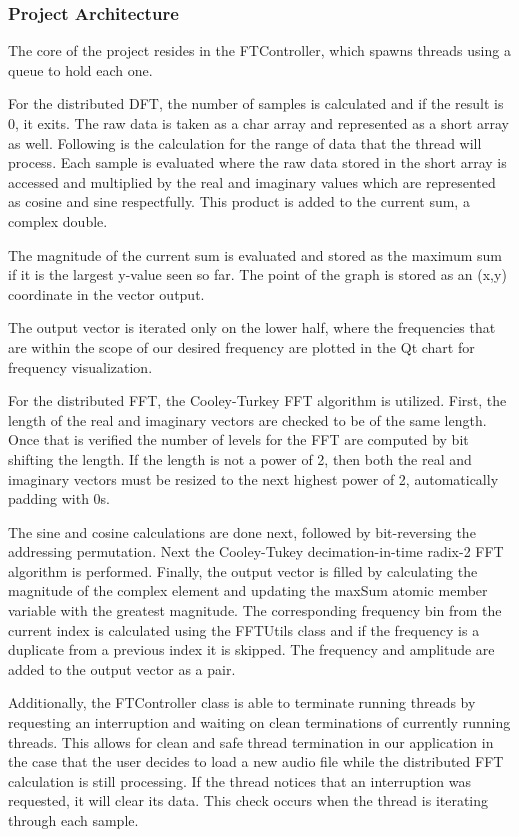 \documentclass[journal]{IEEEtran}
\begin{document}
\subsubsection{Project Architecture}
    \par{
		The core of the project resides in the FTController, which spawns threads using a queue to hold each one.
	}
    \par{
		For the distributed DFT, the number of samples is calculated and if the result is 0, it exits. 
		The raw data is taken as a char array and represented as a short array as well. Following is the calculation 
		for the range of data that the thread will process. Each sample is evaluated where the raw data stored in the 
		short array is accessed and multiplied by the real and imaginary values which are represented as cosine and sine 
		respectfully. This product is added to the current sum, a complex double.
	}
    \par{
		The magnitude of the current sum is evaluated and stored as the maximum sum if it is the largest y-value seen so far. 
		The point of the graph is stored as an (x,y) coordinate in the vector output.
	}
    \par{
		The output vector is iterated only on the lower half, where the frequencies that are within the scope 
		of our desired frequency are plotted in the Qt chart for frequency visualization.
	}
    \par{
		For the distributed FFT, the Cooley-Turkey FFT algorithm is utilized. First, the length of the real and imaginary 
		vectors are checked to be of the same length. Once that is verified the number of levels for the FFT are 
		computed by bit shifting the length. If the length is not a power of 2, then both the real and imaginary 
		vectors must be resized to the next highest power of 2, automatically padding
		with 0s. 
	}
    \par{
		The sine and cosine calculations are done next, followed by bit-reversing the addressing permutation. 
		Next the Cooley-Tukey decimation-in-time radix-2 FFT algorithm is performed. Finally, the output vector is 
		filled by calculating the magnitude of the complex element and updating the maxSum atomic member 
		variable with the greatest magnitude.  The corresponding frequency bin from the current 
		index is calculated using the FFTUtils class and if the frequency is a duplicate from a previous index 
		it is skipped. The frequency and amplitude are added to the output vector as a pair.
	}
    \par{
		Additionally, the FTController class is able to terminate running threads by requesting an interruption and 
		waiting on clean terminations of currently running threads. This allows for clean and safe thread termination
		in our application in the case that the user decides to load a new audio file while the distributed FFT calculation
		is still processing. If the thread notices that an interruption was requested, it will clear 
		its data. This check occurs when the thread is iterating through each sample.
	}
\end{document}
